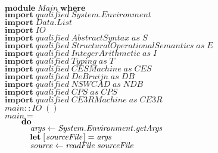 \documentclass[10pt]{article}
\newcommand{\Conid}[1]{\mathit{#1}}
\newcommand{\Varid}[1]{\mathit{#1}}
\begin{document}
\begin{hscode}\SaveRestoreHook
${\mathbf{module}\;\Conid{Main}\;\mathbf{where}}$\\
${}$\\
${\mathbf{import}\;\Varid{qualified}\;\Conid{\Conid{System}.Environment}}$\\
${\mathbf{import}\;\Conid{\Conid{Data}.List}}$\\
${\mathbf{import}\;\Conid{IO}}$\\
${}$\\
${\mathbf{import}\;\Varid{qualified}\;\Conid{AbstractSyntax}\;\Varid{as}\;\Conid{S}}$\\
${\mathbf{import}\;\Varid{qualified}\;\Conid{StructuralOperationalSemantics}\;\Varid{as}\;\Conid{E}}$\\
${\mathbf{import}\;\Varid{qualified}\;\Conid{IntegerArithmetic}\;\Varid{as}\;\Conid{I}}$\\
${\mathbf{import}\;\Varid{qualified}\;\Conid{Typing}\;\Varid{as}\;\Conid{T}}$\\
${}$\\
${}$\\
${\mathbf{import}\;\Varid{qualified}\;\Conid{CESMachine}\;\Varid{as}\;\Conid{CES}}$\\
${}$\\
${\mathbf{import}\;\Varid{qualified}\;\Conid{DeBruijn}\;\Varid{as}\;\Conid{DB}}$\\
${\mathbf{import}\;\Varid{qualified}\;\Conid{NSWCAD}\;\Varid{as}\;\Conid{NDB}}$\\
${}$\\
${\mathbf{import}\;\Varid{qualified}\;\Conid{CPS}\;\Varid{as}\;\Conid{CPS}}$\\
${\mathbf{import}\;\Varid{qualified}\;\Conid{CE3RMachine}\;\Varid{as}\;\Conid{CE3R}}$\\
${}$\\
${\Varid{main}\mathbin{::}\Conid{IO}\;()}$\\
${\Varid{main}\mathrel{=}}$\\
${\hskip2.00em\relax\mathbf{do}}$\\
${\hskip2.00em\relax\hskip1.00em\relax\Varid{args}\leftarrow \Varid{\Conid{System}.\Conid{Environment}.getArgs}}$\\
${\hskip2.00em\relax\hskip1.00em\relax\mathbf{let}\;[\mskip1.5mu \Varid{sourceFile}\mskip1.5mu]\mathrel{=}\Varid{args}}$\\
${\hskip2.00em\relax\hskip1.00em\relax\Varid{source}\leftarrow \Varid{readFile}\;\Varid{sourceFile}}$\\

\end{hscode}
\end{document}
